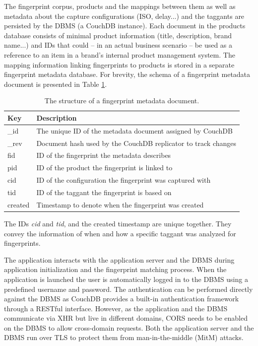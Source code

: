 \documentclass[thesis.tex]{subfiles}
\begin{document}
The fingerprint corpus, products and the mappings between them as well as metadata about the capture configurations (ISO, delay...) and the taggants are persisted by the DBMS (a CouchDB instance). Each document in the products database consists of minimal product information (title, description, brand name...) and IDs that could -- in an actual business scenario -- be used as a reference to an item in a brand's internal product management system. The mapping information linking fingerprints to products is stored in a separate fingerprint metadata database. For brevity, the schema of a fingerprint metadata document is presented in Table \ref{table:fingerprint-metadata-schema}.

\begin{table}[ht]
	\caption{The structure of a fingerprint metadata document.} \label{table:fingerprint-metadata-schema}

	\begin{center}
	\begin{tabular}{| m{1.25cm} | m{11.5cm} |}

		\hline
		\textbf{Key}	& \textbf{Description} \\ \hline
		\_id			& The unique ID of the metadata document assigned by CouchDB \\
		\hline
		\_rev 			& Document hash used by the CouchDB replicator to track changes \\
		\hline
		fid 			& ID of the fingerprint the metadata describes \\
		\hline
		pid 			& ID of the product the fingerprint is linked to \\
		\hline
		cid 			& ID of the configuration the fingerprint was captured with \\
		\hline
		tid 			& ID of the taggant the fingerprint is based on \\
		\hline
		created			& Timestamp to denote when the fingerprint was created \\
		\hline
	\end{tabular}
	\end{center}
\end{table}

\noindent The IDs \emph{cid} and \emph{tid}, and the created timestamp are unique together. They convey the information of when and how a specific taggant was analyzed for fingerprints.

The application interacts with the application server and the DBMS during application initialization and the fingerprint matching process. When the application is launched the user is automatically logged in to the DBMS using a predefined username and password. The authentication can be performed directly against the DBMS as CouchDB provides a built-in authentication framework through a RESTful interface. However, as the application and the DBMS communicate via XHR but live in different domains, CORS needs to be enabled on the DBMS to allow cross-domain requests. Both the application server and the DBMS run over TLS to protect them from man-in-the-middle (MitM) attacks.
\end{document}
